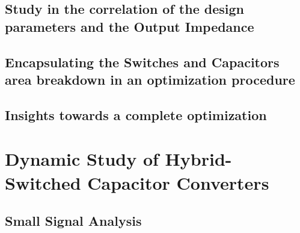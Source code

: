 \section{Study in the correlation of the design parameters and the Output Impedance}
\section{Encapsulating the Switches and Capacitors area breakdown in an optimization procedure}
\section{Insights towards a complete optimization}

\chapter[Dynamic Study]{Dynamic Study of Hybrid-Switched Capacitor Converters}
\section{Small Signal Analysis}


\clearpage

 